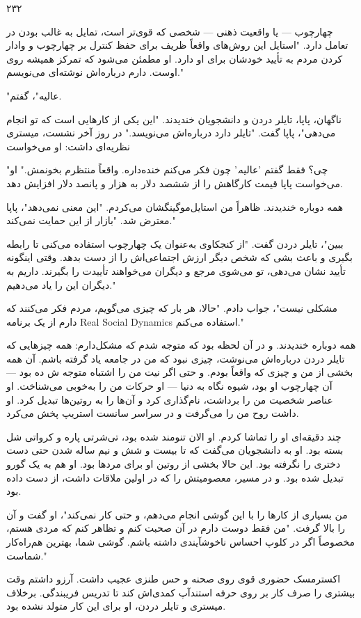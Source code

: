 ۲۳۲

چهارچوب — یا واقعیت ذهنی — شخصی که قوی‌تر است، تمایل به غالب بودن در تعامل دارد. "استایل این روش‌های واقعاً ظریف برای حفظ کنترل بر چهارچوب و وادار کردن مردم به تأیید خودشان برای او دارد. او مطمئن می‌شود که تمرکز همیشه روی اوست. دارم درباره‌اش نوشته‌ای می‌نویسم."

"عالیه"، گفتم.

ناگهان، پاپا، تایلر دردن و دانشجویان خندیدند. "این یکی از کارهایی است که تو انجام می‌دهی"، پاپا گفت. "تایلر دارد درباره‌اش می‌نویسد." در روز آخر نشست، میستری نظریه‌ای داشت: او می‌خواست 

"چی؟ فقط گفتم 'عالیه.' چون فکر می‌کنم خنده‌داره. واقعاً منتظرم بخونمش." او می‌خواست پاپا قیمت کارگاهش را از ششصد دلار به هزار و پانصد دلار افزایش دهد.

همه دوباره خندیدند. ظاهراً من استایل‌موگینگشان می‌کردم. "این معنی نمی‌دهد"، پاپا معترض شد. "بازار از این حمایت نمی‌کند."

ببین"، تایلر دردن گفت. "از کنجکاوی به‌عنوان یک چهارچوب استفاده می‌کنی تا رابطه بگیری و باعث بشی که شخص دیگر ارزش اجتماعی‌اش را از دست بدهد. وقتی اینگونه تأیید نشان می‌دهی، تو می‌شوی مرجع و دیگران می‌خواهند تأییدت را بگیرند. داریم به دیگران این را یاد می‌دهیم."

مشکلی نیست"، جواب دادم. "حالا، هر بار که چیزی می‌گویم، مردم فکر می‌کنند که دارم از یک برنامه Real Social Dynamics استفاده می‌کنم."

همه دوباره خندیدند. و در آن لحظه بود که متوجه شدم که مشکل‌دارم: همه چیزهایی که تایلر دردن درباره‌اش می‌نوشت، چیزی نبود که من در جامعه یاد گرفته باشم. آن همه بخشی از من و چیزی که واقعاً بودم. و حتی اگر نیت من را اشتباه متوجه ش ده بود — آن چهارچوب او بود، شیوه نگاه به دنیا — او حرکات من را به‌خوبی می‌شناخت. او عناصر شخصیت من را برداشت، نام‌گذاری کرد و آن‌ها را به روتین‌ها تبدیل کرد. او داشت روح من را می‌گرفت و در سراسر سانست استریپ پخش می‌کرد.

چند دقیقه‌ای او را تماشا کردم. او الان تنومند شده بود، تی‌شرتی پاره و کرواتی شل بسته بود. او به دانشجویان می‌گفت که تا بیست و شش و نیم ساله شدن حتی دست دختری را نگرفته بود. این حالا بخشی از روتین او برای مردها بود. او هم به یک گورو تبدیل شده بود. و در مسیر، معصومیتش را که در اولین ملاقات داشت، از دست داده بود.

من بسیاری از کارها را با این گوشی انجام می‌دهم، و حتی کار نمی‌کند"، او گفت و آن را بالا گرفت. "من فقط دوست دارم در آن صحبت کنم و تظاهر کنم که مردی هستم، مخصوصاً اگر در کلوپ احساس ناخوشآیندی داشته باشم. گوشی شما، بهترین هم‌راه‌کار شماست."

اکسترمسک حضوری قوی روی صحنه و حس طنزی عجیب داشت. آرزو داشتم وقت بیشتری را صرف کار بر روی حرفه استندآپ کمدی‌اش کند تا تدریس فریبندگی. برخلاف میستری و تایلر دردن، او برای این کار متولد نشده بود.